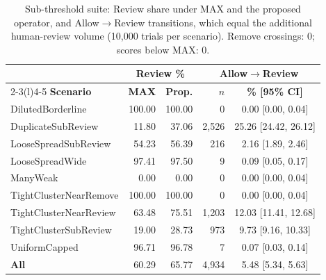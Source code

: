 \begin{table}[!t]
\caption{Sub-threshold suite: Review share under MAX and the proposed operator, and Allow$\to$Review transitions, which equal the additional human-review volume (10,000 trials per scenario). Remove crossings: 0; scores below MAX: 0.}
\label{tab:mc-sub-vs-max}
\centering\scriptsize
\setlength{\tabcolsep}{3pt}
\begin{tabular}{@{}lrrrc@{}}
\toprule
 & \multicolumn{2}{c}{\textbf{Review \%}} & \multicolumn{2}{c}{\textbf{Allow$\to$Review}} \\
\cmidrule(lr){2-3}\cmidrule(l){4-5}
\textbf{Scenario} & \textbf{MAX} & \textbf{Prop.} & \textbf{$n$} & \textbf{\% [95\% CI]} \\
\midrule
DilutedBorderline & 100.00 & 100.00 & 0 & 0.00 [0.00, 0.04] \\
DuplicateSubReview & 11.80 & 37.06 & 2,526 & 25.26 [24.42, 26.12] \\
LooseSpreadSubReview & 54.23 & 56.39 & 216 & 2.16 [1.89, 2.46] \\
LooseSpreadWide & 97.41 & 97.50 & 9 & 0.09 [0.05, 0.17] \\
ManyWeak & 0.00 & 0.00 & 0 & 0.00 [0.00, 0.04] \\
TightClusterNearRemove & 100.00 & 100.00 & 0 & 0.00 [0.00, 0.04] \\
TightClusterNearReview & 63.48 & 75.51 & 1,203 & 12.03 [11.41, 12.68] \\
TightClusterSubReview & 19.00 & 28.73 & 973 & 9.73 [9.16, 10.33] \\
UniformCapped & 96.71 & 96.78 & 7 & 0.07 [0.03, 0.14] \\
\midrule
\textbf{All} & 60.29 & 65.77 & 4,934 & 5.48 [5.34, 5.63] \\
\bottomrule
\end{tabular}
\end{table}
